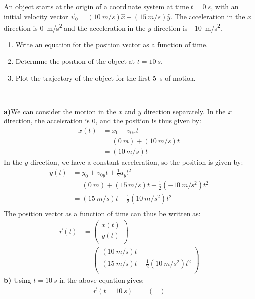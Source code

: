 \begin{example}{An object starts at the origin of a coordinate system at time $t=\SI{0}{s}$, with an initial velocity vector $\vec v_0=(\SI{10}{m/s})\hat x+(\SI{15}{m/s})\hat y$. The acceleration in the $x$ direction is \SI{0}{m/s^2} and the acceleration in the $y$ direction is \SI{-10}{m/s^2}.
\begin{enumerate}[label=(\alph*)]
\item Write an equation for the position vector as a function of time.
\item Determine the position of the object at $t=\SI{10}{s}$.
\item Plot the trajectory of the object for the first \SI{5}{s} of motion.
\end{enumerate}
\ }
\label{ex:chap4:parabola}
\textbf{a)}We can consider the motion in the $x$ and $y$ direction separately. In the $x$ direction, the acceleration is 0, and the position is thus given by:
\begin{align*}
x(t)&=x_0+v_{0x}t\\
&=(\SI{0}{m})+(\SI{10}{m/s})t\\
&=(\SI{10}{m/s})t
\end{align*}
In the $y$ direction, we have a constant acceleration, so the position is given by:
\begin{align*}
y(t) &= y_0+v_{0y}t+\frac{1}{2}a_yt^2\\
&=(\SI{0}{m})+(\SI{15}{m/s})t+\frac{1}{2}(\SI{-10}{m/s^2})t^2\\
&=(\SI{15}{m/s})t-\frac{1}{2}(\SI{10}{m/s^2})t^2\\
\end{align*}
The position vector as a function of time can thus be written as:
\begin{align*}
\vec r(t) &= \begin{pmatrix}
           x(t) \\
           y(t) \\
          \end{pmatrix}\\
          &= \begin{pmatrix}
           (\SI{10}{m/s})t \\
           (\SI{15}{m/s})t-\frac{1}{2}(\SI{10}{m/s^2})t^2 \\
         \end{pmatrix}
\end{align*}
\textbf{b)} Using $t=\SI{10}{s}$ in the above equation gives:
\begin{align*}
\vec r(t=\SI{10}{s})&= \begin{pmatrix}

\end{pmatrix}
\end{align*}
\end{example}
